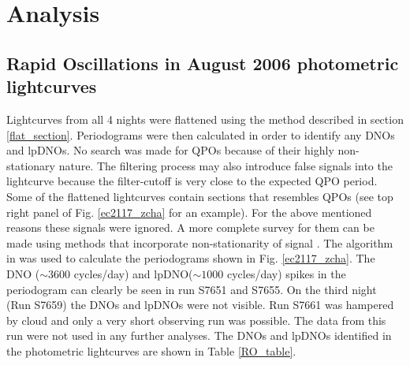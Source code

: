 


\section{Analysis}

\subsection{Rapid Oscillations in August 2006 photometric lightcurves}
\label{ro_phot_lc}

Lightcurves from all 4 nights were flattened using the method described in section \ref{flat_section}. Periodograms were then calculated in order to identify any DNOs and lpDNOs. No search was made for QPOs because of their highly non-stationary nature. The filtering process may also introduce false signals into the lightcurve because the filter-cutoff is very close to the expected QPO period. Some of the flattened lightcurves contain sections that resembles QPOs (see top right panel of Fig. \ref{ec2117_zcha} for an example). For the above mentioned reasons these signals were ignored.  A more complete survey for them can be made using methods that incorporate non-stationarity of signal \citep{blackman}. The algorithm in \cite{kurtz_ft} was used to calculate the periodograms shown in Fig. \ref{ec2117_zcha}. The DNO ($\sim3600$ cycles/day) and lpDNO($\sim1000$ cycles/day) spikes in the periodogram can clearly be seen in run S7651 and S7655. On the third night (Run S7659) the DNOs and lpDNOs were not visible. Run S7661 was hampered by cloud and only a very short observing run was possible. The data from this run were not used in any further analyses. The DNOs and lpDNOs identified in the photometric lightcurves are shown in Table \ref{RO_table}.


